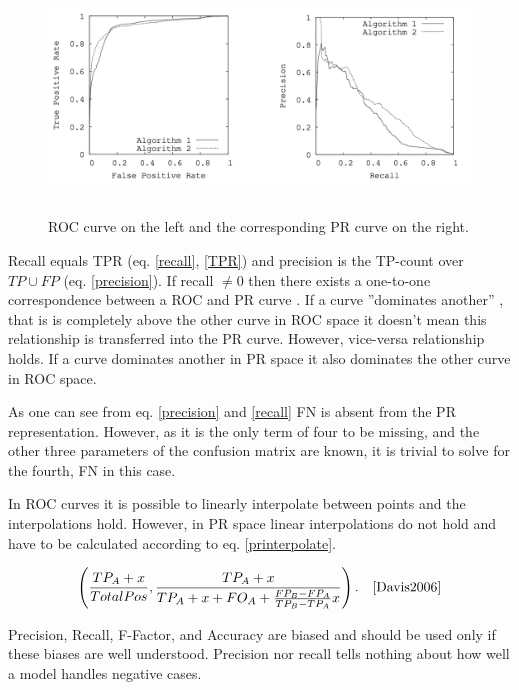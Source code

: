 \documentclass[english,12pt,a4paper,pdftex,elec,utf8, table]{aaltothesis}
\begin{document}
\begin{figure}[htb]
\begin{center}
\includegraphics[height=6cm]{figures/rocpr}
\end{center}
\caption{ROC curve on the left and the corresponding PR curve on the right. \cite{Davis2006}}
\label{rocpr}
\end{figure}

Recall equals TPR (eq. \ref{recall}, \ref{TPR}) and precision is the TP-count over $TP \cup FP$ (eq. \ref{precision}). If recall $\neq 0$ then there exists a one-to-one correspondence between a ROC and PR curve \cite{Davis2006}. If a curve ''dominates another'' \cite{Provost1997}, that is is completely above the other curve in ROC space it doesn't mean this relationship is transferred into the PR curve. However, vice-versa relationship holds. If a curve dominates another in PR space it also dominates the other curve in ROC space. \cite{Davis2006}

As one can see from eq. \ref{precision} and \ref{recall} FN is absent from the PR representation. However, as it is the only term of four to be missing, and the other three parameters of the confusion matrix are known, it is trivial to solve for the fourth, FN in this case. \cite{Davis2006}

In ROC curves it is possible to linearly interpolate between points and the interpolations hold. However, in PR space linear interpolations do not hold and have to be calculated according to eq. \ref{printerpolate}. \cite{Davis2006}

\begin{equation}\label{printerpolate}
\left(\frac{TP_A+x}{Total Pos}, \frac{TP_A+x}{TP_A+x+FO_A+ \frac{FP_B-FP_A}{TP_B-TP_A}x} \right). \quad \cite{Davis2006}
\end{equation}

Precision, Recall, F-Factor, and Accuracy are biased and should be used only if these biases are well understood. Precision nor recall tells nothing about how well a model handles negative cases. \cite{POWERS2011}
\end{document}
